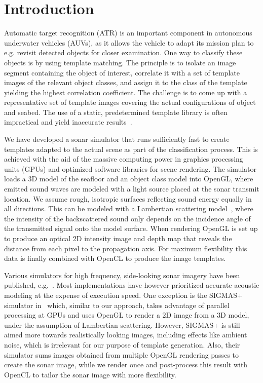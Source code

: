 \documentclass[
   UAM                                          %
 , 12pt                                         %
 , bibtex                                       %
 , layout
]{common/mytemplate}
\begin{document}
\section{Introduction}

Automatic target recognition (ATR) is an important component in autonomous underwater vehicles (AUVs), as it allows the vehicle to adapt its mission plan to e.g. revisit detected objects for closer examination. One way to classify these objects is by using template matching. The principle is to isolate an image segment containing the object of interest, correlate it with a set of template images of the relevant object classes, and assign it to the class of the template yielding the highest correlation coefficient. The challenge is to come up with a representative set of template images covering the actual configurations of object and seabed. The use of a static, predetermined template library is often impractical and yield inaccurate results~\cite{Midelfart2010}.

We have developed a sonar simulator that runs sufficiently fast to create templates adapted to the actual scene as part of the classification process. This is achieved with the aid of the massive computing power in graphics processing units (GPUs) and optimized software libraries for scene rendering. The simulator loads a 3D model of the seafloor and an object class model into OpenGL, where emitted sound waves are modeled with a light source placed at the sonar transmit location. We assume rough, isotropic surfaces reflecting sound energy equally in all directions. This can be modeled with a Lambertian scattering model~\cite{Blake1993,Bell1995}, where the intensity of the backscattered sound only depends on the incidence angle of the transmitted signal onto the model surface. When rendering OpenGL is set up to produce an optical 2D intensity image and depth map that reveals the distance from each pixel to the propagation axis. For maximum flexibility this data is finally combined with OpenCL to produce the image templates.

Various simulators for high frequency, side-looking sonar imagery have been published, e.g.~\cite{Bell1997,Sammelm2003}. Most implementations have however prioritized accurate acoustic modeling at the expense of execution speed. One exception is the SIGMAS+ simulator in~\cite{Coiras2009a, Coiras2009b} which, similar to our approach, takes advantage of parallel processing at GPUs and uses OpenGL to render a 2D image from a 3D model, under the assumption of Lambertian scattering. However, SIGMAS+ is still aimed more towards realistically looking images, including effects like ambient noise, which is irrelevant for our purpose of template generation. Also, their simulator sums images obtained from multiple OpenGL rendering passes to create the sonar image, while we render once and post-process this result with OpenCL to tailor the sonar image with more flexibility.
\end{document}

